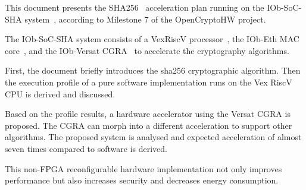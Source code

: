 This document presents the SHA256~\cite{SHA_NIST_FIPS} acceleration plan
running on the IOb-SoC-SHA system~\cite{iob-soc-sha}, according to Milestone 7
of the OpenCryptoHW project.

The IOb-SoC-SHA system consists of a VexRiscV processor~\cite{VexRiscv}, the
IOb-Eth MAC core~\cite{iob-eth}, and the IOb-Versat CGRA~\cite{iob-versat} to
accelerate the cryptography algorithms.

First, the document briefly introduces the sha256 cryptographic algorithm. Then
the execution profile of a pure software implementation runs on the Vex RiscV
CPU is derived and discussed.

Based on the profile results, a hardware accelerator using the Versat CGRA is
proposed. The CGRA can morph into a different acceleration to support other
algorithms. The proposed system is analysed and expected acceleration of
almost seven times compared to software is derived.

This non-FPGA reconfigurable hardware implementation not only improves
performance but also increases security and decreases energy consumption.
